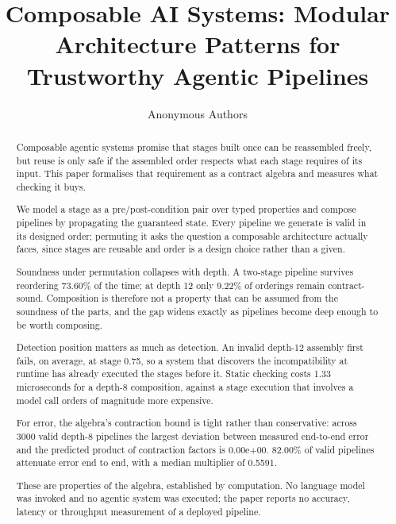 \documentclass[10pt,twocolumn,letterpaper]{article}
\begin{document}
\title{Composable AI Systems: Modular Architecture Patterns for Trustworthy Agentic Pipelines}

\author{
Anonymous Authors
}

\maketitle

\begin{abstract}
Composable agentic systems promise that stages built once can be reassembled freely, but reuse is only safe if the assembled order respects what each stage requires of its input. This paper formalises that requirement as a contract algebra and measures what checking it buys.

We model a stage as a pre/post-condition pair over typed properties and compose pipelines by propagating the guaranteed state. Every pipeline we generate is valid in its designed order; permuting it asks the question a composable architecture actually faces, since stages are reusable and order is a design choice rather than a given.

Soundness under permutation collapses with depth. A two-stage pipeline survives reordering 73.60\% of the time; at depth 12 only 9.22\% of orderings remain contract-sound. Composition is therefore not a property that can be assumed from the soundness of the parts, and the gap widens exactly as pipelines become deep enough to be worth composing.

Detection position matters as much as detection. An invalid depth-12 assembly first fails, on average, at stage 0.75, so a system that discovers the incompatibility at runtime has already executed the stages before it. Static checking costs 1.33 microseconds for a depth-8 composition, against a stage execution that involves a model call orders of magnitude more expensive.

For error, the algebra's contraction bound is tight rather than conservative: across 3000 valid depth-8 pipelines the largest deviation between measured end-to-end error and the predicted product of contraction factors is 0.00e+00. 82.00\% of valid pipelines attenuate error end to end, with a median multiplier of 0.5591.

These are properties of the algebra, established by computation. No language model was invoked and no agentic system was executed; the paper reports no accuracy, latency or throughput measurement of a deployed pipeline.
\end{abstract}
\end{document}
